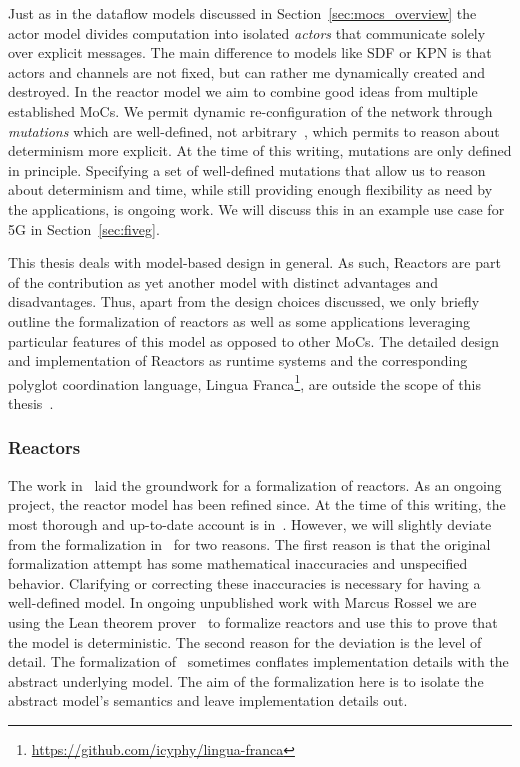 Just as in the dataflow models discussed in Section~\ref{sec:mocs_overview} the actor model divides computation into isolated \emph{actors} that communicate solely over explicit messages.
The main difference to models like \ac{SDF} or \ac{KPN} is that actors and channels are not fixed, but can rather me dynamically created and destroyed.
In the reactor model we aim to combine good ideas from multiple established \acp{MoC}.
We permit dynamic re-configuration of the network through \emph{mutations} which are well-defined, not arbitrary~\cite{lohstroh_cyphy19}, which permits to reason about determinism more explicit. 
At the time of this writing, mutations are only defined in principle.
Specifying a set of well-defined mutations that allow us to reason about determinism and time, while still providing enough flexibility as need by the applications, is ongoing work.
We will discuss this in an example use case for 5G in Section~\ref{sec:fiveg}.

This thesis deals with model-based design in general.
As such, Reactors are part of the contribution as yet another model with distinct advantages and disadvantages.
Thus, apart from the design choices discussed, we only briefly outline the formalization of reactors as well as some applications leveraging particular features of this model as opposed to other \acp{MoC}.
The detailed design and implementation of Reactors as runtime systems and the corresponding polyglot coordination language, Lingua Franca\footnote{\url{https://github.com/icyphy/lingua-franca}}, are outside the scope of this thesis~\cite{lingua_franca,lohstroh_phdthesis}.

\subsubsection{Reactors}

The work in~\cite{lohstroh_cyphy19} laid the groundwork for a formalization of reactors.
As an ongoing project, the reactor model has been refined since. At the time of this writing, the most thorough and up-to-date account is in~\cite{lohstroh_phdthesis}.
However, we will slightly deviate from the formalization in~\cite{lohstroh_cyphy19,lohstroh_phdthesis} for two reasons.
The first reason is that the original formalization attempt has some mathematical inaccuracies and unspecified behavior.
Clarifying or correcting these inaccuracies is necessary for having a well-defined model.
In ongoing unpublished work with Marcus Rossel we are using the Lean theorem prover~\cite{lean} to formalize reactors and use this to prove that the model is deterministic.
The second reason for the deviation is the level of detail. The formalization of~\cite{lohstroh_cyphy19,lohstroh_phdthesis} sometimes conflates implementation details with the abstract underlying model.
The aim of the formalization here is to isolate the abstract model's semantics and leave implementation details out.

